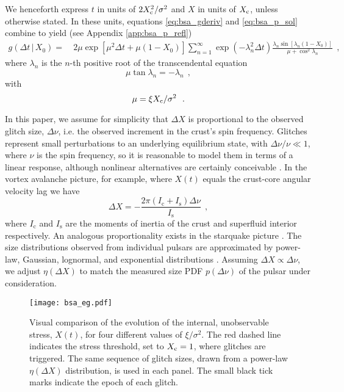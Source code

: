 We henceforth express $t$ in units of $2X_\textrm{c}^2/\sigma^2$ and $X$ in units of $X_\textrm{c}$, unless otherwise stated. In these units, equations \eqref{eq:bsa_gderiv} and \eqref{eq:bsa_p_sol} combine to yield (see Appendix \ref{app:bsa_p_refl})
\begin{align}
\label{eq:bsa_grefl}
g(\Delta t \,|\, X_0) = &~ 2 \mu \exp\left[\mu^2 \Delta t + \mu (1 - X_0)\right] \sum_{n=1}^\infty \exp(-\lambda_n^2 \Delta t) \frac{\lambda_n \sin[\lambda_n(1 - X_0)]}{\mu + \cos^2\lambda_n}\ \ ,
\end{align}
where $\lambda_n$ is the $n$-th positive root of the transcendental equation
\begin{equation}
\label{eq:bsa_lamn}
 \mu \tan \lambda_n = -\lambda_n\ \ ,
\end{equation}
with
\begin{equation}
\mu = \xi \xc / \sigma^2\ \ .
\end{equation}

In this paper, we assume for simplicity that $\Delta X$ is proportional to the observed glitch size, $\Delta \nu$, i.e. the observed increment in the crust's spin frequency. Glitches represent small perturbations to an underlying equilibrium state, with $\Delta \nu / \nu \ll 1$, where $\nu$ is the spin frequency, so it is reasonable to model them in terms of a linear response, although nonlinear alternatives are certainly conceivable \citep{Alpar2006, Akbal2017}. In the vortex avalanche picture, for example, where $X(t)$ equals the crust-core angular velocity lag we have \citep{Fulgenzi2017}
\begin{equation}
\label{eq:bsa_delx}
\Delta X = -\frac{2\pi(I_\textrm{c} + I_\textrm{s}) \Delta \nu}{I_\textrm{s}}\ \ ,
\end{equation}
where $I_\textrm{c}$ and $I_\textrm{s}$ are the moments of inertia of the crust and superfluid interior respectively. An analogous proportionality exists in the starquake picture \citep{Middleditch2006, Chugunov2010}. The size distributions observed from individual pulsars are approximated by power-law, Gaussian, lognormal, and exponential distributions \citep{Melatos2008, Howitt2018, Fuentes2019}. Assuming $\Delta X \propto \Delta \nu$, we adjust $\eta(\Delta X)$ to match the measured size PDF $p(\Delta \nu)$ of the pulsar under consideration. 

\begin{figure}
\centering
\texttt{[image: bsa\_eg.pdf]}
\caption{Visual comparison of the evolution of the internal, unobservable stress, $X(t)$, for four different values of $\xi/\sigma^2$. The red dashed line indicates the stress threshold, set to $X_\textrm{c}=1$, where glitches are triggered. The same sequence of glitch sizes, drawn from a power-law $\eta(\Delta X)$ distribution, is used in each panel. The small black tick marks indicate the epoch of each glitch.}
\label{fig:bsa_mus_comp}
\end{figure}

